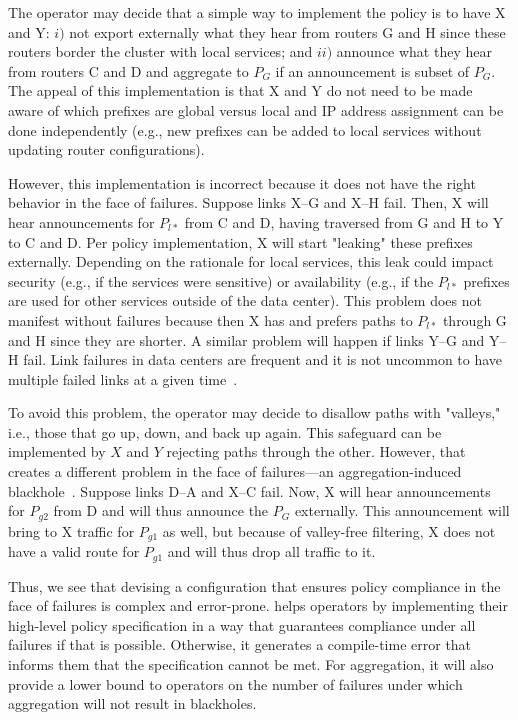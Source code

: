 The operator may decide that a simple way to implement the policy is to have X and Y: $i)$ not export externally what they hear from routers G and H since these routers border the cluster with local services; and $ii)$ announce what they hear from routers C and D and aggregate to $P_G$ if an announcement is subset of $P_G$. The appeal of this implementation is that X and Y do not need to be made aware of which prefixes are global versus local and IP address assignment can be done independently (e.g., new prefixes can be added to local services without updating router configurations).

However, this implementation is incorrect because it does not have the right behavior in the face of failures. Suppose links X--G and X--H fail. Then, X will hear announcements for $P_{l*}$ from C and D, having traversed from G and H to Y to C and D. Per policy implementation, X will start "leaking" these prefixes externally. Depending on the rationale for local services, this leak could impact security (e.g., if the services were sensitive) or availability (e.g., if the $P_{l*}$ prefixes are used for other services outside of the data center). This problem does not manifest without failures because then X has and prefers paths to $P_{l*}$ through G and H since they are shorter. A similar problem will happen if links Y--G and Y--H fail.
Link failures in data centers are frequent and it is not uncommon to have multiple failed links at a given time~\cite{dc-failure-study}.

To avoid this problem, the operator may decide to disallow paths with "valleys," i.e., those that go up, down, and back up again. This safeguard can be implemented by $X$ and $Y$ rejecting paths through the other. However, that creates a different problem in the face of failures---an aggregation-induced blackhole~\cite{xx}. Suppose links D--A and X--C fail. Now, X will hear announcements for $P_{g2}$ from D and will thus announce the $P_G$ externally. This announcement will bring to X traffic for $P_{g1}$ as well, but because of valley-free filtering, X does not have a valid route for $P_{g1}$ and will thus drop all traffic to it.

Thus, we see that devising a configuration that ensures policy compliance in the face of failures is complex and error-prone. \sysname helps operators by implementing their high-level policy specification in a way that guarantees compliance under all failures if that is possible. Otherwise, it generates a compile-time error that informs them that the specification cannot be met. For aggregation, it will also provide a lower bound to operators on the number of failures under which aggregation will not result in blackholes.

